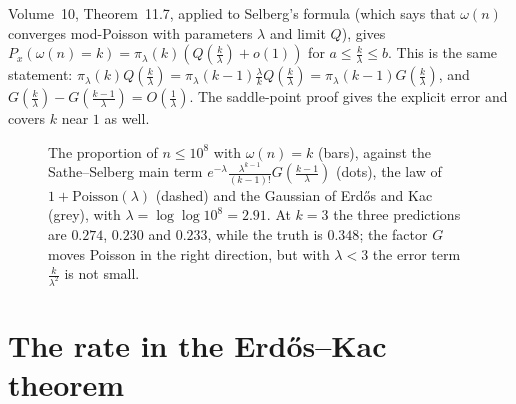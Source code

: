 \begin{remark}
Volume~10, Theorem~11.7, applied to Selberg's formula (which says that $\omega(n)$ converges mod-Poisson with parameters $\lambda$ and limit $Q$), gives $P_x(\omega(n)=k)=\pi_\lambda(k)(Q(\frac k\lambda)+o(1))$ for $a\le\frac k\lambda\le b$. This is the same statement: $\pi_\lambda(k)Q(\frac k\lambda)=\pi_\lambda(k-1)\frac\lambda kQ(\frac k\lambda)=\pi_\lambda(k-1)G(\frac k\lambda)$, and $G(\frac k\lambda)-G(\frac{k-1}\lambda)=O(\frac1\lambda)$. The saddle-point proof gives the explicit error and covers $k$ near $1$ as well.
\end{remark}

\begin{figure}[ht]
\centering{}
\caption{The proportion of $n\le10^8$ with $\omega(n)=k$ (bars), against the Sathe--Selberg main term $e^{-\lambda}\frac{\lambda^{k-1}}{(k-1)!}G(\frac{k-1}\lambda)$ (dots), the law of $1+\mathrm{Poisson}(\lambda)$ (dashed) and the Gaussian of Erd\H{o}s and Kac (grey), with $\lambda=\log\log10^8=2.91$. At $k=3$ the three predictions are $0.274$, $0.230$ and $0.233$, while the truth is $0.348$; the factor $G$ moves Poisson in the right direction, but with $\lambda<3$ the error term $\frac k{\lambda^2}$ is not small.}
\label{fig:sathelocal}
\end{figure}

\section{The rate in the Erd\H{o}s--Kac theorem}

